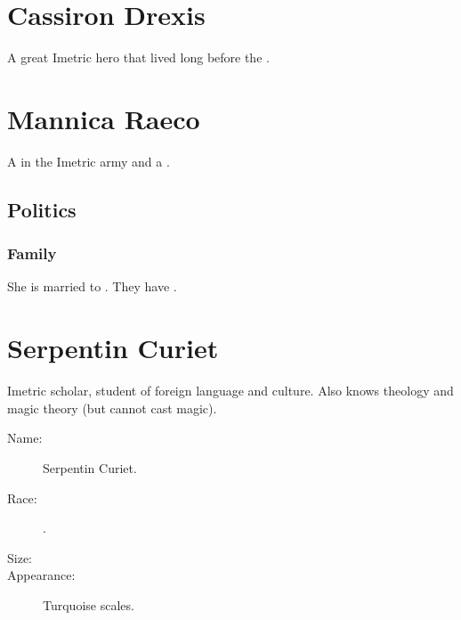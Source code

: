 \section{Cassiron Drexis}
A great Imetric hero that lived long before the \thirdbanewar. 















\section{Mannica Raeco}
A \Retaxis{} in the Imetric army and a \nycaneer. 









\subsection{Politics}
\subsubsection{Family}
She is married to . 
They have .















\section{Serpentin Curiet}
Imetric scholar, student of foreign language and culture. Also knows theology and magic theory (but cannot cast magic). 

\begin{description}
  \item[Name:] Serpentin Curiet. 
  \item[Race:] \Scatha{}. 
  \item[Size:] 
  \item[Appearance:] Turquoise scales. 
\end{description}









